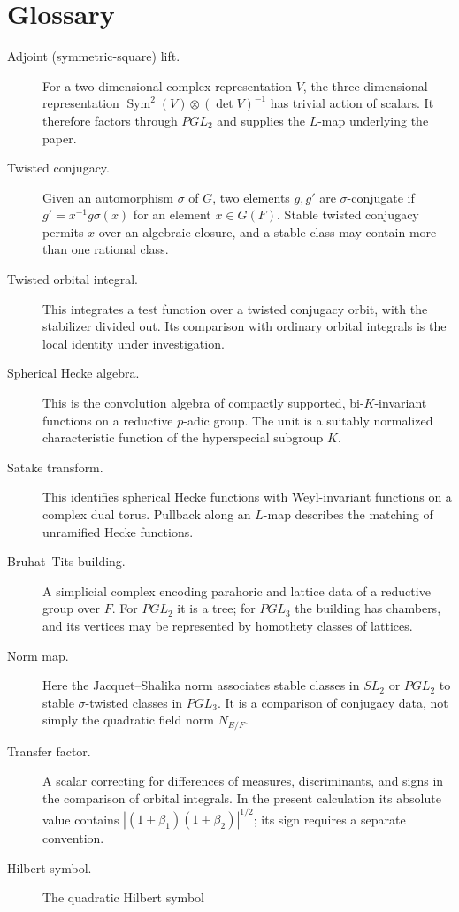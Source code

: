 \documentclass[12pt,letterpaper]{amsart}
\numberwithin{equation}{section}
\theoremstyle{definition}
\theoremstyle{plain}
\begin{document}
\section{Glossary}
\begin{description}
\item[Adjoint (symmetric-square) lift.] For a two-dimensional complex
representation $V$, the three-dimensional representation
$\operatorname{Sym}^2(V)\otimes(\det V)^{-1}$ has trivial action of
scalars. It therefore factors through $PGL_2$ and supplies the
$L$-map underlying the paper.
\item[Twisted conjugacy.] Given an automorphism $\sigma$ of $G$,
two elements $g,g'$ are $\sigma$-conjugate if
$g'=x^{-1}g\sigma(x)$ for an element $x\in G(F)$.
Stable twisted conjugacy permits $x$ over an algebraic closure, and a
stable class may contain more than one rational class.
\item[Twisted orbital integral.] This integrates a test function over
a twisted conjugacy orbit, with the stabilizer divided out.
Its comparison with ordinary orbital integrals is the local identity
under investigation.
\item[Spherical Hecke algebra.] This is the convolution algebra of
compactly supported, bi-$K$-invariant functions on a reductive
$p$-adic group. The unit is a suitably normalized characteristic
function of the hyperspecial subgroup $K$.
\item[Satake transform.] This identifies spherical Hecke functions
with Weyl-invariant functions on a complex dual torus. Pullback
along an $L$-map describes the matching of unramified Hecke functions.
\item[Bruhat--Tits building.] A simplicial complex encoding
parahoric and lattice data of a reductive group over $F$.
For $PGL_2$ it is a tree; for $PGL_3$ the building has chambers,
and its vertices may be represented by homothety classes of lattices.
\item[Norm map.] Here the Jacquet--Shalika norm associates stable
classes in $SL_2$ or $PGL_2$ to stable $\sigma$-twisted classes in
$PGL_3$. It is a comparison of conjugacy data, not simply the
quadratic field norm $N_{E/F}$.
\item[Transfer factor.] A scalar correcting for differences of
measures, discriminants, and signs in the comparison of orbital
integrals. In the present calculation its absolute value contains
$|(1+\beta_1)(1+\beta_2)|^{1/2}$; its sign requires a separate convention.
\item[Hilbert symbol.] The quadratic Hilbert symbol

\end{description}
\end{document}
